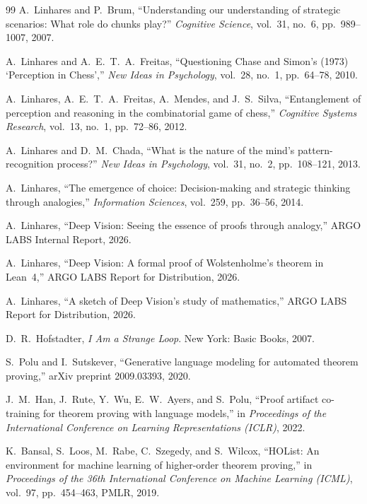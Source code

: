\documentclass[11pt]{article}
\theoremstyle{definition}
\theoremstyle{remark}
\begin{document}
\begin{thebibliography}{99}
A.~Linhares and P.~Brum,
``Understanding our understanding of strategic scenarios: What role
do chunks play?''
\emph{Cognitive Science}, vol.~31, no.~6, pp.~989--1007, 2007.

A.~Linhares and A.~E.~T.~A.~Freitas,
``Questioning Chase and Simon's (1973) `Perception in Chess',''
\emph{New Ideas in Psychology}, vol.~28, no.~1, pp.~64--78, 2010.

A.~Linhares, A.~E.~T.~A.~Freitas, A.~Mendes, and J.~S.~Silva,
``Entanglement of perception and reasoning in the combinatorial
game of chess,''
\emph{Cognitive Systems Research}, vol.~13, no.~1, pp.~72--86, 2012.

A.~Linhares and D.~M.~Chada,
``What is the nature of the mind's pattern-recognition process?''
\emph{New Ideas in Psychology}, vol.~31, no.~2, pp.~108--121, 2013.

A.~Linhares,
``The emergence of choice: Decision-making and strategic thinking
through analogies,''
\emph{Information Sciences}, vol.~259, pp.~36--56, 2014.

A.~Linhares,
``Deep Vision: Seeing the essence of proofs through analogy,''
ARGO LABS Internal Report, 2026.

A.~Linhares,
``Deep Vision: A formal proof of Wolstenholme's theorem in Lean~4,''
ARGO LABS Report for Distribution, 2026.

A.~Linhares,
``A sketch of Deep Vision's study of mathematics,''
ARGO LABS Report for Distribution, 2026.


D.~R.~Hofstadter,
\emph{I Am a Strange Loop}.
New York: Basic Books, 2007.

S.~Polu and I.~Sutskever,
``Generative language modeling for automated theorem proving,''
arXiv preprint 2009.03393, 2020.

J.~M.~Han, J.~Rute, Y.~Wu, E.~W.~Ayers, and S.~Polu,
``Proof artifact co-training for theorem proving with language
models,''
in \emph{Proceedings of the International Conference on Learning
Representations (ICLR)}, 2022.

K.~Bansal, S.~Loos, M.~Rabe, C.~Szegedy, and S.~Wilcox,
``HOList: An environment for machine learning of higher-order
theorem proving,''
in \emph{Proceedings of the 36th International Conference on Machine
Learning (ICML)}, vol.~97, pp.~454--463, PMLR, 2019.


\end{thebibliography}
\end{document}

